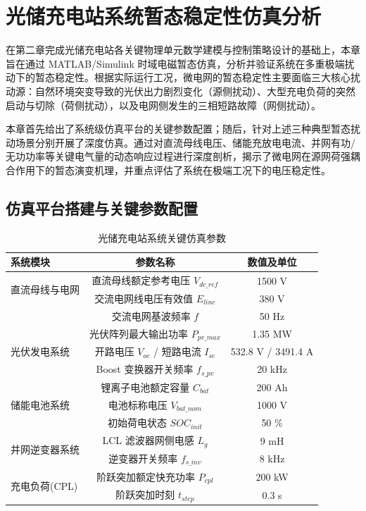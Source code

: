 
\section{光储充电站系统暂态稳定性仿真分析}

在第二章完成光储充电站各关键物理单元数学建模与控制策略设计的基础上，本章旨在通过 MATLAB/Simulink 时域电磁暂态仿真，分析并验证系统在多重极端扰动下的暂态稳定性。根据实际运行工况，微电网的暂态稳定性主要面临三大核心扰动源：自然环境突变导致的光伏出力剧烈变化（源侧扰动）、大型充电负荷的突然启动与切除（荷侧扰动），以及电网侧发生的三相短路故障（网侧扰动）。

本章首先给出了系统级仿真平台的关键参数配置；随后，针对上述三种典型暂态扰动场景分别开展了深度仿真。通过对直流母线电压、储能充放电电流、并网有功/无功功率等关键电气量的动态响应过程进行深度剖析，揭示了微电网在源网荷强耦合作用下的暂态演变机理，并重点评估了系统在极端工况下的电压稳定性。

\subsection{仿真平台搭建与关键参数配置}

\begin{table}[htbp]
    \centering
    \caption{光储充电站系统关键仿真参数}
    \label{tab:sim_parameters}
    \begin{tabular}{lcc}
        \toprule
        \textbf{系统模块} & \textbf{参数名称} & \textbf{数值及单位} \\
        \midrule
        \multirow{2}{*}{直流母线与电网} 
        & 直流母线额定参考电压 $V_{dc\_ref}$ & 1500 V \\
        & 交流电网线电压有效值 $E_{line}$ & 380 V \\
        & 交流电网基波频率 $f$ & 50 Hz \\
        \midrule
        \multirow{3}{*}{光伏发电系统} 
        & 光伏阵列最大输出功率 $P_{pv\_max}$ & 1.35 MW \\
        & 开路电压 $V_{oc}$ / 短路电流 $I_{sc}$ & 532.8 V / 3491.4 A \\
        & Boost 变换器开关频率 $f_{s\_pv}$ & 20 kHz \\
        \midrule
        \multirow{3}{*}{储能电池系统} 
        & 锂离子电池额定容量 $C_{bat}$ & 200 Ah \\
        & 电池标称电压 $V_{bat\_nom}$ & 1000 V \\
        & 初始荷电状态 $SOC_{init}$ & 50 \% \\
        \midrule
        \multirow{2}{*}{并网逆变器系统} 
        & LCL 滤波器网侧电感 $L_{g}$ & 9 mH \\
        & 逆变器开关频率 $f_{s\_inv}$ & 8 kHz \\
        \midrule
        \multirow{2}{*}{充电负荷(CPL)} 
        & 阶跃突加额定快充功率 $P_{cpl}$ & 200 kW \\
        & 阶跃突加时刻 $t_{step}$ & 0.3 s \\
        \bottomrule
    \end{tabular}
\end{table}

